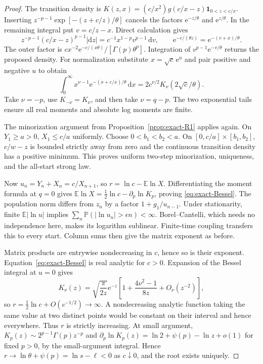 \begin{proof}
The transition density is $K(z,x)=(c/x^2)g(c/x-z)\mathbf1_{0<z<c/x}$. Inserting $z^{-p-1}\exp[-(z+c/z)/\theta]$ cancels the factors $\mathrm{e}^{-z/\theta}$ and $\mathrm{e}^{z/\theta}$. In the remaining integral put $v=c/z-x$. Direct calculation gives
\begin{equation}
 z^{-p-1}(c/x-z)^{p-1}|\mathrm{d}z|
 =c^{-1}x^{1-p}v^{p-1}\,\mathrm{d}v,
 \qquad \mathrm{e}^{-c/(\theta z)}=\mathrm{e}^{-(v+x)/\theta}.
 \label{eq:exact-GIG-substitution}
\end{equation}
The outer factor is $cx^{-2}\mathrm{e}^{-c/(x\theta)}/[\Gamma(p)\theta^p]$. Integration of $v^{p-1}\mathrm{e}^{-v/\theta}$ returns the proposed density. For normalization substitute $x=\sqrt c\,\mathrm{e}^u$ and pair positive and negative $u$ to obtain
\begin{equation}
 \int_0^\infty x^{\nu-1}\mathrm{e}^{-(x+c/x)/\theta}\,\mathrm{d}x
 =2c^{\nu/2}K_\nu(2\sqrt c/\theta).
 \label{eq:exact-GIG-moment}
\end{equation}
Take $\nu=-p$, use $K_{-\nu}=K_\nu$, and then take $\nu=q-p$. The two exponential tails ensure all real moments and absolute log moments are finite.

The minorization argument from Proposition~\ref{prop:exact-R1} applies again. On $Y_1\geq a>0$, $X_1\leq c/a$ uniformly. Choose $0<b_1<b_2<a$. On $[0,c/a]\times[b_1,b_2]$, $c/w-z$ is bounded strictly away from zero and the continuous transition density has a positive minimum. This proves uniform two-step minorization, uniqueness, and the all-start strong law.

Now $u_n=Y_n+X_n=c/X_{n+1}$, so $r=\ln c-\mathbb E\ln X$. Differentiating the moment formula at $q=0$ gives $\mathbb E\ln X=\tfrac12\ln c-\partial_p\ln K_p$, proving \eqref{eq:exact-Bessel}. The population norm differs from $z_n$ by a factor $1+g_1/u_{n-1}$. Under stationarity, finite $\mathbb E|\ln u|$ implies $\sum_n\mathbb P(|\ln u_n|>\epsilon n)<\infty$. Borel--Cantelli, which needs no independence here, makes its logarithm sublinear. Finite-time coupling transfers this to every start. Column sums then give the matrix exponent as before.

Matrix products are entrywise nondecreasing in $c$, hence so is their exponent. Equation~\eqref{eq:exact-Bessel} is real analytic for $c>0$. Expansion of the Bessel integral at $u=0$ gives
\begin{equation}
 K_\nu(z)=\sqrt{\frac\pi{2z}}\mathrm{e}^{-z}
 \left[1+\frac{4\nu^2-1}{8z}+O_\nu(z^{-2})\right],
 \label{eq:exact-Bessel-large}
\end{equation}
so $r=\tfrac12\ln c+O(c^{-1/2})\to\infty$. A nondecreasing analytic function taking the same value at two distinct points would be constant on their interval and hence everywhere. Thus $r$ is strictly increasing. At small argument, $K_p(z)\sim2^{p-1}\Gamma(p)z^{-p}$ and $\partial_p\ln K_p(z)=\ln2+\psi(p)-\ln z+o(1)$ for fixed $p>0$, by the small-argument integral. Hence $r\to\ln\theta+\psi(p)=\ln s-\ell<0$ as $c\downarrow0$, and the root exists uniquely.


\end{proof}
